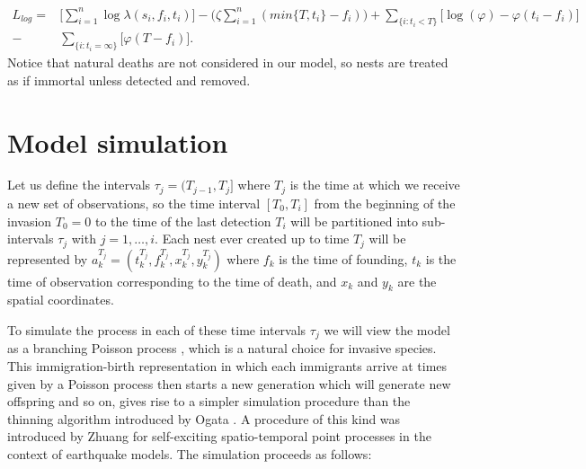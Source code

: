 \documentclass{article}
\begin{document}
\begin{equation*}
    \begin{aligned}
        L_{log} = & \Bigg[ \sum_{i = 1}^{n} \log \lambda(s_{i},f_{i}, t_{i}) \Bigg] - \bigg(\zeta \sum_{i=1}^{n} (min\{ T, t_i \} - f_i) \bigg)  + \sum_{\{ i : t_{i} < T \} }  \bigg[\log (\varphi) -\varphi(t_{i} - f_{i}) \bigg] \\
        - & \sum_{ \{ i : t_{i} = \infty \} } \bigg[\varphi(T - f_{i}) \bigg].
    \end{aligned}
\end{equation*}
Notice that natural deaths are not considered in our model, so nests are treated as if immortal unless detected and removed.







\section{Model simulation} \label{section:simulationModel}

{\color{red} Let us define the intervals $\tau_j = (T_{j-1}, T_j]$ where $T_j$ is the time at which we receive a new set of observations, so the time interval $[T_0, T_i]$ from the beginning of the invasion $T_0=0$ to the time of the last detection $T_i$ will be partitioned into sub-intervals $\tau_j$ with $j = 1, \dots, i$. Each nest ever created up to time $T_j$ will be represented by $a^{T_j}_k = (t_k^{T_j}, f_k^{T_j}, x_k^{T_j}, y_k^{T_j})$ where $f_k$ is the time of founding, $t_k$ is the time of observation corresponding to the time of death, and $x_k$ and $y_k$ are the spatial coordinates.}

To simulate the process in each of these time intervals $\tau_j$ we will view the model as a branching Poisson process \cite{Lewis}, which is a natural choice for invasive species. This immigration-birth representation {\color{red}in which each immigrants arrive at times given by a Poisson process then starts a new generation which will generate new offspring and so on,} gives rise to a simpler simulation procedure than the thinning algorithm introduced by Ogata \cite{Ogata81}. A procedure of this kind was introduced by Zhuang \cite{Zhuang} for self-exciting spatio-temporal point processes in the context of earthquake models. The simulation proceeds as follows:
\end{document}
